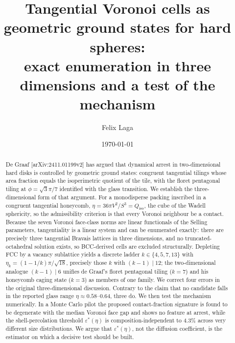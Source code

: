 \documentclass[aps,prl,twocolumn,superscriptaddress,floatfix]{revtex4-2}
\begin{document}
\title{Tangential Voronoi cells as geometric ground states for hard spheres:\\
exact enumeration in three dimensions and a test of the mechanism}

\author{Felix Laga}

\date{\today}

\begin{abstract}
De Graaf [arXiv:2411.01199v2] has argued that dynamical arrest in two-dimensional
hard disks is controlled by geometric ground states: congruent tangential
tilings whose area fraction equals the isoperimetric quotient of the tile, with
the floret pentagonal tiling at $\phi=\sqrt{3}\pi/7$ identified with the glass
transition. We establish the three-dimensional form of that argument. For a
monodisperse packing inscribed in a congruent tangential honeycomb,
$\eta = 36\pi V^2/S^3 = Q_{\mathrm{iso}}$, the cube of the Wadell sphericity, so
the admissibility criterion is that every Voronoi neighbour be a contact. Because
the seven Voronoi face-class norms are linear functionals of the Selling
parameters, tangentiality is a linear system and can be enumerated exactly: there
are precisely three tangential Bravais lattices in three dimensions, and no
truncated-octahedral solution exists, so BCC-derived cells are excluded
structurally. Depleting FCC by a vacancy sublattice yields a discrete ladder
$k\in\{4,5,7,13\}$ with $\eta_k=(1-1/k)\pi/\sqrt{18}$, precisely those $k$ with
$(k-1)\mid 12$; the two-dimensional analogue $(k-1)\mid 6$ unifies de Graaf's
floret pentagonal tiling ($k=7$) and his honeycomb caging state ($k=3$) as
members of one family. We correct four errors in the original
three-dimensional discussion. Contrary to the claim that no candidate falls in
the reported glass range $\eta\approx0.58$--$0.64$, three do. We then test the
mechanism numerically. In a Monte Carlo pilot the proposed contact-fraction
signature is found to be degenerate with the median Voronoi face gap and shows no
feature at arrest, while the shell-percolation threshold $\varepsilon^*(\eta)$ is
composition-independent to $4.3\%$ across very different size distributions. We
argue that $\varepsilon^*(\eta)$, not the diffusion coefficient, is the estimator
on which a decisive test should be built.
\end{abstract}

\maketitle
\end{document}
